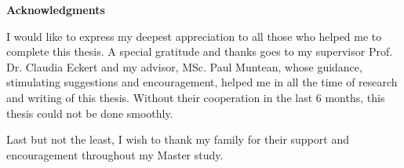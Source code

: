 \clearemptydoublepage
{}
{}	



\vspace*{2cm}

\begin{center}
{\Large \bf Acknowledgments}
\end{center}

\vspace{1cm}




I would like to express my deepest appreciation to all those who helped me to complete this thesis. A special gratitude and thanks goes to my supervisor Prof. Dr. Claudia Eckert and my advisor, MSc. Paul Muntean, whose guidance, stimulating suggestions and encouragement, helped me in all the time of research and writing of this thesis. Without their cooperation in the last 6 months, this thesis could not be done smoothly.

Last but not the least, I wish to thank my family for their support and encouragement throughout my Master study.